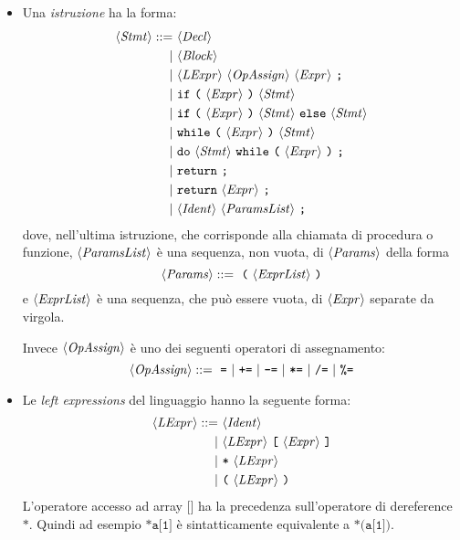 \begin{itemize}
\item Una \emph{istruzione} ha la forma:
\begin{align*}
\langle \mathit{Stmt} \rangle ::=\ &\langle \mathit{Decl} \rangle\\
|\ &\langle \mathit{Block} \rangle\\
|\ &\langle \mathit{LExpr} \rangle\ \langle \mathit{OpAssign} \rangle\ \langle \mathit{Expr} \rangle\ \texttt{;}\\
|\ &\texttt{if}\ \texttt{(}\ \langle \mathit{Expr} \rangle\ \texttt{)}\ \langle \mathit{Stmt} \rangle\\
|\ &\texttt{if}\ \texttt{(}\ \langle \mathit{Expr} \rangle\ \texttt{)}\ \langle \mathit{Stmt} \rangle\ \texttt{else}\ \langle \mathit{Stmt} \rangle\\
|\ &\texttt{while}\ \texttt{(}\ \langle \mathit{Expr} \rangle\ \texttt{)}\ \langle \mathit{Stmt} \rangle\\
|\ &\texttt{do}\ \langle \mathit{Stmt} \rangle\ \texttt{while}\ \texttt{(}\ \langle \mathit{Expr} \rangle\ \texttt{)}\ \texttt{;}\\
|\ &\texttt{return}\ \texttt{;}\\
|\ &\texttt{return}\ \langle \mathit{Expr} \rangle\ \texttt{;}\\
|\ &\langle \mathit{Ident} \rangle\ \langle \mathit{ParamsList} \rangle\ \texttt{;}
\end{align*}
dove, nell'ultima istruzione, che corrisponde alla chiamata di procedura o funzione, $\langle \mathit{ParamsList} \rangle$ è una sequenza, non vuota, di $\langle \mathit{Params} \rangle$ della forma
\begin{equation*}
\langle \mathit{Params} \rangle ::=\ \texttt{(}\ \langle \mathit{ExprList} \rangle\ \texttt{)}
\end{equation*}
e $\langle \mathit{ExprList} \rangle$ è una sequenza, che può essere vuota, di $\langle \mathit{Expr} \rangle$ separate da virgola.

Invece $\langle \mathit{OpAssign} \rangle$ è uno dei seguenti operatori di assegnamento:
\begin{equation*}
\langle \mathit{OpAssign} \rangle ::=\ \texttt{=}\ |\ \texttt{+=}\ |\ \texttt{-=}\ |\ \texttt{*=}\ |\ \texttt{/=}\ |\ \texttt{\%=}
\end{equation*}

\item Le \emph{left expressions} del linguaggio hanno la seguente forma:
\begin{align*}
\langle \mathit{LExpr} \rangle ::=\ &\langle \mathit{Ident} \rangle\\
|\ &\langle \mathit{LExpr} \rangle\ \texttt{[}\ \langle \mathit{Expr} \rangle\ \texttt{]}\\
|\ &\texttt{*}\ \langle \mathit{LExpr} \rangle\\
|\ &\texttt{(}\ \langle \mathit{LExpr} \rangle\ \texttt{)}
\end{align*}
L'operatore accesso ad array $\texttt{[]}$ ha la precedenza sull'operatore di dereference $\texttt{*}$. Quindi ad esempio $\texttt{*a[1]}$ è sintatticamente equivalente a $\texttt{*(a[1])}$.


\end{itemize}
